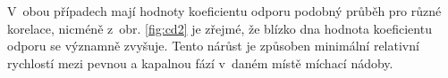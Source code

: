 
 V~obou případech mají hodnoty koeficientu odporu podobný průběh pro různé korelace, nicméně z~obr. \ref{fig:cd2} je zřejmé, že blízko dna hodnota koeficientu odporu se významně zvyšuje. Tento nárůst je způsoben minimální relativní rychlostí mezi pevnou a kapalnou fází v~daném místě míchací nádoby.